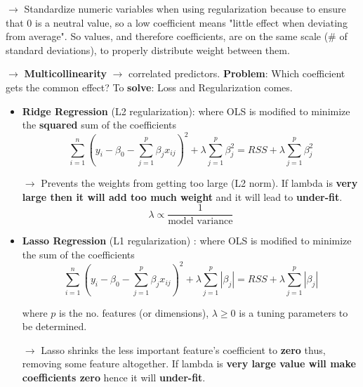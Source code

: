 \documentclass[letterpaper, 10.5pt,landscape]{article}
\begin{document}
\begin{multicols*}{3}
$\rightarrow$ Standardize numeric variables when using regularization because to ensure that 0 is a neutral value, so a low coefficient means "little effect when deviating from average". So values, and therefore coefficients, are on the same scale (\# of standard deviations), to properly distribute weight between them.

$\rightarrow$ \textbf{Multicollinearity} $\rightarrow$ correlated predictors. \textbf{Problem}: Which coefficient gets the common effect? To \textbf{solve}: Loss and Regularization comes. \\


\begin{itemize}

     \item \textbf{Ridge Regression} (L2 regularization): where OLS is modified to minimize the \textbf{squared} sum of the coefficients 
     \vspace{-4pt}
    \[ \boxed{\sum^{n}_{i=1} (y_{i} - \beta_{0} - \sum^{p}_{j=1} \beta_{j} x_{ij})^{2} + \lambda \sum^{p}_{j=1} \beta^{2}_{j} = RSS + \lambda \sum^{p}_{j=1} \beta^{2}_{j}} \]
    \vspace{-7pt}
    
   $\rightarrow$ Prevents the weights from getting too large (L2 norm). If lambda is \textbf{very large then it will add too much weight} and it will lead to \textbf{under-fit}.
   \vspace{-5pt}
   \[ \boxed{ \lambda \propto \frac{1} {\text{model variance}}}  \]
    
    \item \textbf{Lasso Regression} (L1 regularization) : where OLS is modified to minimize the sum of the coefficients 
    \vspace{-3pt}
    \[ \boxed{\sum^{n}_{i=1} (y_{i} - \beta_{0} - \sum^{p}_{j=1} \beta_{j} x_{ij})^{2} + \lambda \sum^{p}_{j=1} \left| \beta_{j} \right| = RSS + \lambda \sum^{p}_{j=1} \left| \beta_{j} \right|}  \]
    \vspace{-10pt}
     
    where $p$ is the no. features (or dimensions), $\lambda \geq 0$ is a tuning parameters to be determined. 
    
    \vspace{2pt}
    
   $\rightarrow$ Lasso shrinks the less important feature’s coefficient to \textbf{zero} thus, removing some feature altogether. If lambda is \textbf{very large value will make coefficients zero} hence it will \textbf{under-fit}.
   \vspace{-3pt}
\end{itemize}


\end{multicols*}
\end{document}
